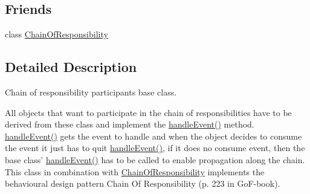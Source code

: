 \subsection*{Friends}
\begin{DoxyCompactItemize}
\item 
class \hyperlink{classAbstractResponsibility_a481df313240bacf48790db6d338f51d0}{Chain\-Of\-Responsibility}
\end{DoxyCompactItemize}


\subsection{Detailed Description}
Chain of responsibility participants base class. 

All objects that want to participate in the chain of responsibilities have to be derived from these class and implement the \hyperlink{classAbstractResponsibility_a14d885884ae4841dbe7c5824b986f2c9}{handle\-Event()} method. \hyperlink{classAbstractResponsibility_a14d885884ae4841dbe7c5824b986f2c9}{handle\-Event()} gets the event to handle and when the object decides to consume the event it just has to quit \hyperlink{classAbstractResponsibility_a14d885884ae4841dbe7c5824b986f2c9}{handle\-Event()}, if it does no consume event, then the base class' \hyperlink{classAbstractResponsibility_a14d885884ae4841dbe7c5824b986f2c9}{handle\-Event()} has to be called to enable propagation along the chain. This class in combination with \hyperlink{classChainOfResponsibility}{Chain\-Of\-Responsibility} implements the behavioural design pattern Chain Of Responsibility (p. 223 in Go\-F-\/book). 


